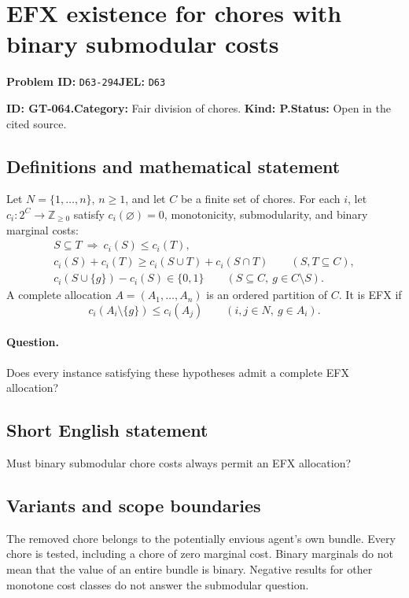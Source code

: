 \documentclass[11pt,a4paper]{article}
\begin{document}
\section*{EFX existence for chores with binary submodular costs}
\textbf{Problem ID:} \texttt{D63-294}\quad \textbf{JEL:} \texttt{D63}\par
\label{problem:OP-0194}
\label{game:GT-064}
{\sffamily\small\color{muted}
\noindent\textbf{ID: GT-064.}\quad\textbf{Category:} Fair division of chores.
\quad\textbf{Kind: P.}\quad\textbf{Status:} Open in the cited source.
\par}
\subsection*{Definitions and mathematical statement}
Let \(N=\{1,\ldots,n\}\), \(n\geq 1\), and let \(C\) be a finite set
of chores. For each \(i\), let
\(c_i:2^C\to\mathbb Z_{\geq 0}\) satisfy \(c_i(\varnothing)=0\),
monotonicity, submodularity, and binary marginal costs:
\[
 \begin{gathered}
 S\subseteq T\ \Longrightarrow\ c_i(S)\leq c_i(T),\\
 c_i(S)+c_i(T)\geq c_i(S\cup T)+c_i(S\cap T)
 \qquad(S,T\subseteq C),\\
 c_i(S\cup\{g\})-c_i(S)\in\{0,1\}
 \qquad(S\subseteq C,\ g\in C\setminus S).
 \end{gathered}
\]
A complete allocation \(A=(A_1,\ldots,A_n)\) is an ordered partition
of \(C\). It is EFX if
\[
 c_i(A_i\setminus\{g\})\leq c_i(A_j)
 \qquad(i,j\in N,\ g\in A_i).
\]

\paragraph{Question.}
Does every instance satisfying these hypotheses admit a complete EFX
allocation?

\subsection*{Short English statement}
Must binary submodular chore costs always permit an EFX allocation?

\subsection*{Variants and scope boundaries}
The removed chore belongs to the potentially envious agent's own bundle.
Every chore is tested, including a chore of zero marginal cost.
Binary marginals do not mean that the value of an entire bundle is binary.
Negative results for other monotone cost classes do not answer the
submodular question.
\end{document}
